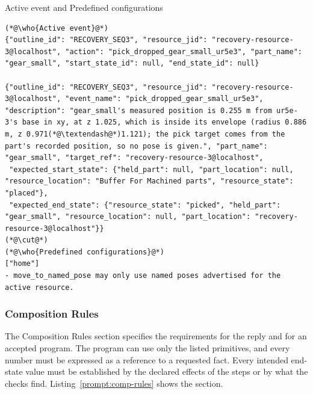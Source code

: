 \begin{recbox}{Active event and Predefined configurations}
\begin{lstlisting}
(*@\who{Active event}@*)
{"outline_id": "RECOVERY_SEQ3", "resource_jid": "recovery-resource-3@localhost", "action": "pick_dropped_gear_small_ur5e3", "part_name": "gear_small", "start_state_id": null, "end_state_id": null}

{"outline_id": "RECOVERY_SEQ3", "resource_jid": "recovery-resource-3@localhost", "event_name": "pick_dropped_gear_small_ur5e3", "description": "gear_small's measured position is 0.255 m from ur5e-3's base in xy, at z 1.025, which is inside its envelope (radius 0.886 m, z 0.971(*@\textendash@*)1.121); the pick target comes from the part's recorded position, so no pose is given.", "part_name": "gear_small", "target_ref": "recovery-resource-3@localhost",
 "expected_start_state": {"held_part": null, "part_location": null, "resource_location": "Buffer For Machined parts", "resource_state": "placed"},
 "expected_end_state": {"resource_state": "picked", "held_part": "gear_small", "resource_location": null, "part_location": "recovery-resource-3@localhost"}}
(*@\cut@*)
(*@\who{Predefined configurations}@*)
["home"]
- move_to_named_pose may only use named poses advertised for the active resource.
\end{lstlisting}
\end{recbox}

\subsubsection{Composition Rules}\label{sec:comp-rules}

The Composition Rules section specifies the requirements for the reply and for an accepted
program. The program can use only the listed primitives, and every number must be expressed as
a reference to a requested fact. Every intended end-state value must be established by the
declared effects of the steps or by what the checks find. Listing~\ref{prompt:comp-rules} shows the section.

